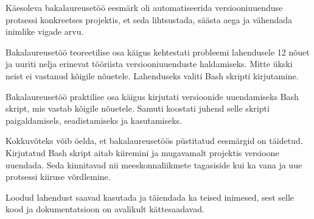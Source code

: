 \documentclass[12pt]{article}
\begin{document}
  Käesoleva bakalaureusetöö eesmärk oli automatiseerida versiooniuuenduse protsessi konkreetses projektis, et seda lihtsustada, säästa aega ja vähendada inimlike vigade arvu.
  
  Bakalaureusetöö teoreetilise osa käigus kehtestati probleemi lahendusele 12 nõuet ja uuriti nelja erinevat tööriista versiooniuuenduste haldamiseks. Mitte ükski neist ei vastanud kõigile nõuetele. Lahenduseks valiti Bash skripti kirjutamine.
  
  Bakalaureusetöö praktilise osa käigus kirjutati versioonide uuendamiseks Bash skript, mis vastab kõigile nõuetele. Samuti koostati juhend selle skripti paigaldamisels, seadistamiseks ja kasutamiseks.
  
  Kokkuvõteks võib öelda, et bakalaureusetöös püstitatud eesmärgid on täidetud. Kirjutatud Bash skript aitab kiiremini ja mugavamalt projektis versioone uuendada. Seda kinnitavad nii meeskonnaliikmete tagasiside kui ka vana ja uue protsessi kiiruse võrdlemine.
  
  Loodud lahendust saavad kasutada ja täiendada ka teised inimesed, sest selle kood ja dokumentatsioon on avalikult kättesaadavad.

  \newpage
  
\end{document}

